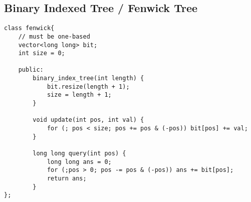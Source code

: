 \subsection{Binary Indexed Tree / Fenwick Tree}
\begin{verbatim}
class fenwick{
    // must be one-based
    vector<long long> bit;
    int size = 0;

    public:
        binary_index_tree(int length) {
            bit.resize(length + 1);
            size = length + 1;
        }

        void update(int pos, int val) {
            for (; pos < size; pos += pos & (-pos)) bit[pos] += val;
        }

        long long query(int pos) {
            long long ans = 0;
            for (;pos > 0; pos -= pos & (-pos)) ans += bit[pos];
            return ans;
        }
};
\end{verbatim}